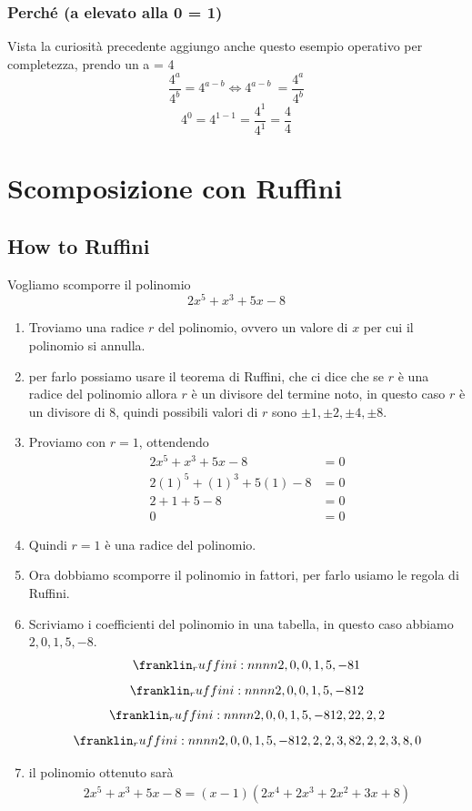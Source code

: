 \documentclass{book}
\begin{document}
\begin{curiosity}
    \subsubsection{Perché (a elevato alla 0 = 1)}
    Vista la curiosità precedente aggiungo anche questo esempio operativo per completezza, prendo un a = 4
    \[ \frac{4^a}{4^b} = 4^{a-b} \Longleftrightarrow 4^{a-b} \ = \frac{4^a}{4^b}  \]
    \[4^0 = 4^{1-1} = \frac{4^1}{4^1} = \frac{4}{4} \]
\end{curiosity}

\section{Scomposizione con Ruffini}
\subsection{How to Ruffini}
\begin{example}
    Vogliamo scomporre il polinomio
    \[2x^5 + x^3 + 5x - 8\]
    \begin{enumerate}
        \item Troviamo una radice \(r\) del polinomio, ovvero un valore di \(x\) per cui il polinomio si annulla.
        \item per farlo possiamo usare il teorema di Ruffini, che ci dice che se \(r\) è una radice del polinomio allora \(r\) è un divisore del termine noto, in questo caso \(r\) è un divisore di \(8\), quindi possibili valori di \(r\) sono \(\pm 1, \pm 2, \pm 4, \pm 8\).
        \item Proviamo con \(r = 1\), ottendendo
              \begin{align*}
                  2x^5 + x^3 + 5x - 8       & = 0 \\
                  2(1)^5 + (1)^3 + 5(1) - 8 & = 0 \\
                  2 + 1 + 5 - 8             & = 0 \\
                  0                         & = 0
              \end{align*}
        \item Quindi \(r = 1\) è una radice del polinomio.
        \item Ora dobbiamo scomporre il polinomio in fattori, per farlo usiamo le regola di Ruffini.
        \item Scriviamo i coefficienti del polinomio in una tabella, in questo caso abbiamo \(2, 0, 1, 5, -8\).
              \[
                  \ruffini{2,0,0,1,5,-8}{1}{ }{ }
              \]
              \[
                  \ruffini{2,0,0,1,5,-8}{1}{}{2}
              \]
              \[
                  \ruffini{2,0,0,1,5,-8}{1}{2,2}{2,2,2}
              \]
              \[
                  \ruffini{2,0,0,1,5,-8}{1}{2,2,2,3,8}{2,2,2,3,8,0}
              \]
        \item il polinomio ottenuto sarà
              \begin{align*}
                  2x^5 + x^3 + 5x - 8 = (x-1)(2x^4 + 2x^3 + 2x^2 + 3x + 8)
              \end{align*}
    \end{enumerate}
\end{example}
\end{document}
